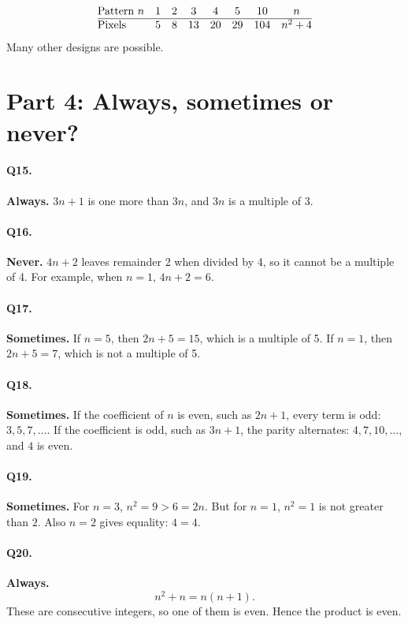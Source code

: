 \documentclass[11pt,a4paper]{article}
\begin{document}
\[
\begin{array}{@{}lccccccc@{}}
\text{Pattern }n&1&2&3&4&5&10&n\\ \hline
\text{Pixels}&5&8&13&20&29&104&n^2+4
\end{array}
\]
Many other designs are possible.

\section*{Part 4: Always, sometimes or never?}

\paragraph{Q15.} \textbf{Always.} \(3n+1\) is one more than \(3n\), and \(3n\) is a multiple of 3.

\paragraph{Q16.} \textbf{Never.} \(4n+2\) leaves remainder 2 when divided by 4, so it cannot be a multiple of 4. For example, when \(n=1\), \(4n+2=6\).

\paragraph{Q17.} \textbf{Sometimes.} If \(n=5\), then \(2n+5=15\), which is a multiple of 5. If \(n=1\), then \(2n+5=7\), which is not a multiple of 5.

\paragraph{Q18.} \textbf{Sometimes.} If the coefficient of \(n\) is even, such as \(2n+1\), every term is odd: \(3,5,7,\ldots\). If the coefficient is odd, such as \(3n+1\), the parity alternates: \(4,7,10,\ldots\), and \(4\) is even.

\paragraph{Q19.} \textbf{Sometimes.} For \(n=3\), \(n^2=9>6=2n\). But for \(n=1\), \(n^2=1\) is not greater than \(2\). Also \(n=2\) gives equality: \(4=4\).

\paragraph{Q20.} \textbf{Always.}
\[
n^2+n=n(n+1).
\]
These are consecutive integers, so one of them is even. Hence the product is even.
\end{document}
